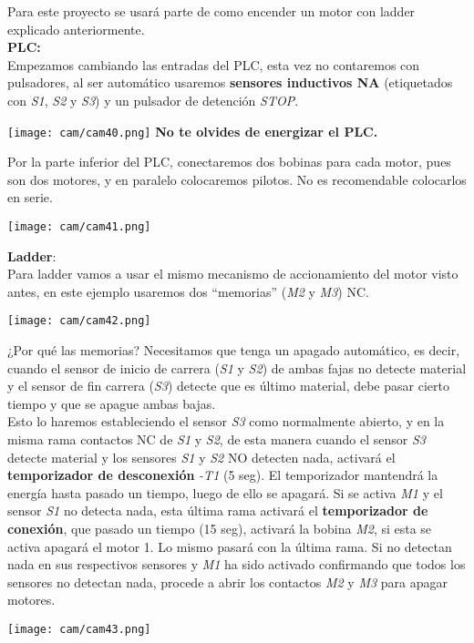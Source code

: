 \documentclass[
	12pt, %
	fleqn, %
	a4paper, %
	oneside, %
]{LegrandOrangeBook}
\begin{document}
\begin{example}
Para este proyecto se usará parte de como  encender un motor con ladder explicado anteriormente.\\
\textbf{PLC:}\\
Empezamos cambiando las entradas del PLC, esta vez no contaremos con pulsadores, al ser automático usaremos \textbf{sensores inductivos NA} (etiquetados con \textit{S1}, \textit{S2} y \textit{S3}) y un pulsador de detención \textit{STOP}.
\begin{center}
\texttt{[image: cam/cam40.png]}
\textbf{No te olvides de energizar el PLC.}
\end{center}
Por la parte inferior del PLC, conectaremos dos bobinas para cada motor, pues son dos motores, y en paralelo colocaremos pilotos. No es recomendable colocarlos en serie.
\begin{center}
\texttt{[image: cam/cam41.png]}
\end{center}
\textbf{Ladder}:\\
Para ladder vamos a usar el mismo mecanismo de accionamiento del motor visto antes, en este ejemplo usaremos dos ``memorias'' (\textit{M2} y \textit{M3}) NC.
\begin{center}
\texttt{[image: cam/cam42.png]}
\end{center}
¿Por qué las memorias? Necesitamos que tenga un apagado automático, es decir, cuando el sensor de inicio de carrera (\textit{S1} y \textit{S2}) de ambas fajas no detecte material y el sensor de fin carrera (\textit{S3}) detecte que es último material, debe pasar cierto tiempo y que se apague ambas bajas.\\
Esto lo haremos estableciendo el sensor \textit{S3} como normalmente abierto, y en la misma rama contactos NC de \textit{S1} y \textit{S2}, de esta manera cuando el sensor \textit{S3} detecte material y los sensores \textit{S1} y \textit{S2} NO detecten nada, activará el \textbf{temporizador de desconexión} \textit{-T1} (5 seg). El temporizador mantendrá la energía hasta pasado un tiempo, luego de ello se apagará. Si se activa \textit{M1} y el sensor \textit{S1} no detecta nada, esta última rama activará el \textbf{temporizador de conexión}, que pasado un tiempo (15 seg), activará la bobina \textit{M2}, si esta se activa apagará el motor 1. Lo mismo pasará con la última rama. Si no detectan nada en sus respectivos sensores y \textit{M1} ha sido activado confirmando que todos los sensores no detectan nada, procede a abrir los contactos \textit{M2} y \textit{M3} para apagar motores.
\begin{center}
\texttt{[image: cam/cam43.png]}
\end{center}
\end{example}
\end{document}

